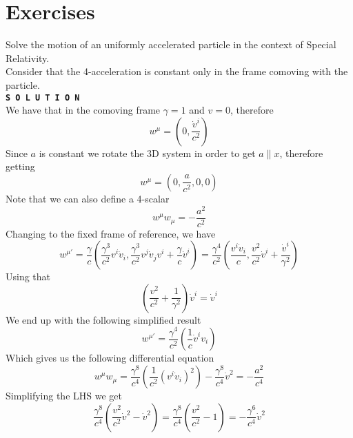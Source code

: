 \documentclass[../admech.tex]{subfiles}
\begin{document}
\section{Exercises}
\begin{exe}
	Solve the motion of an uniformly accelerated particle in the context of Special Relativity.\\
	Consider that the 4-acceleration is constant only in the frame comoving with the particle.\\
	\textbf{\texttt{S O L U T I O N}}\\
	We have that in the comoving frame $\gamma=1$ and $v=0$, therefore
	\begin{equation*}
		w^\mu=\left( 0,\frac{\dot{v}^i}{c^2} \right)
	\end{equation*}
	Since $a$ is constant we rotate the 3D system in order to get $a\parallel x$, therefore getting
	\begin{equation*}
		w^\mu=\left( 0,\frac{a}{c^2},0,0 \right)
	\end{equation*}
	Note that we can also define a 4-scalar
	\begin{equation*}
		w^\mu w_\mu=-\frac{a^2}{c^2}
	\end{equation*}
	Changing to the fixed frame of reference, we have
	\begin{equation*}
		w^{\mu'}=\frac{\gamma}{c}\left( \frac{\gamma^3}{c^2}v^{i}\dot{v}_i,\frac{\gamma^3}{c^2}v^{j}\dot{v}_jv^{i}+\frac{\gamma}{c}\dot{v}^{i} \right)=\frac{\gamma^4}{c^2}\left( \frac{v^{i}\dot{v}_i}{c},\frac{v^{2}}{c^2}\dot{v}^{i}+\frac{\dot{v}^{i}}{\gamma^2} \right)
	\end{equation*}
	Using that
	\begin{equation*}
		\left( \frac{v^2}{c^2}+\frac{1}{\gamma^2} \right)\dot{v}^i=\dot{v}^i
	\end{equation*}
	We end up with the following simplified result
	\begin{equation*}
		w^{\mu'}=\frac{\gamma^4}{c^2}\left( \frac{1}{c}\dot{v}^{i}v_i \right)
	\end{equation*}
	Which gives us the following differential equation
	\begin{equation*}
		w^\mu w_\mu=\frac{\gamma^8}{c^4}\left( \frac{1}{c^2}(v^i\dot{v}_i)^2 \right)-\frac{\gamma^8}{c^4}\dot{v}^2=-\frac{a^2}{c^4}
	\end{equation*}
	Simplifying the LHS we get
	\begin{equation*}
		\frac{\gamma^8}{c^4}\left( \frac{v^2}{c^2}\dot{v}^2-\dot{v}^2 \right)=\frac{\gamma^8}{c^4}\left( \frac{v^2}{c^2}-1 \right)=-\frac{\gamma^6}{c^4}\dot{v}^2

\end{equation*}
\end{exe}
\end{document}
